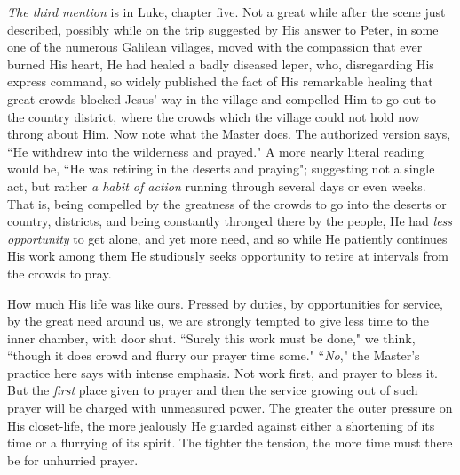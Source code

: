 \textit{The third mention} is in Luke, chapter five. Not a great while after the
scene just described, possibly while on the trip suggested by His answer
to Peter, in some one of the numerous Galilean villages, moved with the
compassion that ever burned His heart, He had healed a badly diseased
leper, who, disregarding His express command, so widely published the fact
of His remarkable healing that great crowds blocked Jesus' way in the
village and compelled Him to go out to the country district, where the
crowds which the village could not hold now throng about Him. Now note
what the Master does. The authorized version says, ``He withdrew into the
wilderness and prayed." A more nearly literal reading would be, ``He was
retiring in the deserts and praying"; suggesting not a single act, but
rather \textit{a habit of action} running through several days or even weeks.
That is, being compelled by the greatness of the crowds to go into the
deserts or country, districts, and being constantly thronged there by the
people, He had \textit{less opportunity} to get alone, and yet more need, and so
while He patiently continues His work among them He studiously seeks
opportunity to retire at intervals from the crowds to pray.

How much His life was like ours. Pressed by duties, by opportunities for
service, by the great need around us, we are strongly tempted to give less
time to the inner chamber, with door shut. ``Surely this work must be
done," we think, ``though it does crowd and flurry our prayer time some."
``\textit{No}," the Master's practice here says with intense emphasis. Not work
first, and prayer to bless it. But the \textit{first} place given to prayer and
then the service growing out of such prayer will be charged with
unmeasured power. The greater the outer pressure on His closet-life, the
more jealously He guarded against either a shortening of its time or a
flurrying of its spirit. The tighter the tension, the more time must there
be for unhurried prayer.

